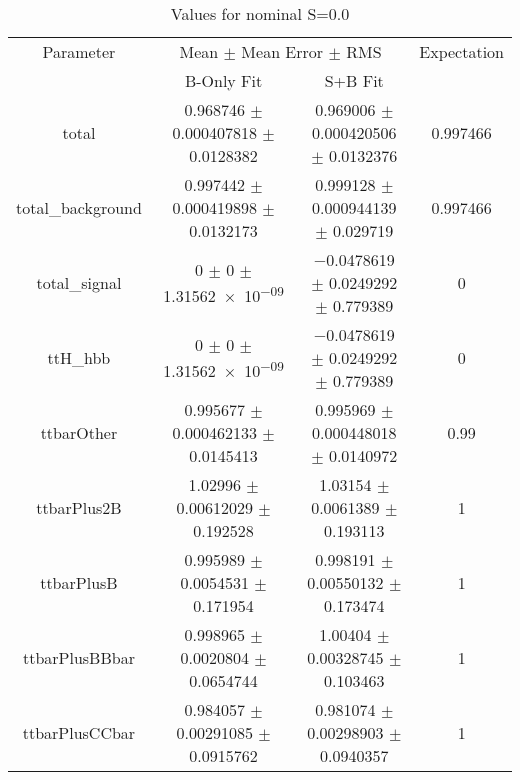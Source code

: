 \begin{table}
\centering
\caption{Values for nominal S=0.0}
\begin{tabular}{cccc}
\toprule
Parameter & \multicolumn{2}{c}{Mean $\pm$ Mean Error $\pm$ RMS} & Expectation\\
 & B-Only Fit & S+B Fit & \\
\midrule
total & \num{0.968746} $\pm$ \num{0.000407818} $\pm$ \num{0.0128382} & \num{0.969006} $\pm$ \num{0.000420506} $\pm$ \num{0.0132376} & \num{0.997466}\\
total\_background & \num{0.997442} $\pm$ \num{0.000419898} $\pm$ \num{0.0132173} & \num{0.999128} $\pm$ \num{0.000944139} $\pm$ \num{0.029719} & \num{0.997466}\\
total\_signal & \num{0} $\pm$ \num{0} $\pm$ \num{1.31562e-09} & \num{-0.0478619} $\pm$ \num{0.0249292} $\pm$ \num{0.779389} & \num{0}\\
ttH\_hbb & \num{0} $\pm$ \num{0} $\pm$ \num{1.31562e-09} & \num{-0.0478619} $\pm$ \num{0.0249292} $\pm$ \num{0.779389} & \num{0}\\
ttbarOther & \num{0.995677} $\pm$ \num{0.000462133} $\pm$ \num{0.0145413} & \num{0.995969} $\pm$ \num{0.000448018} $\pm$ \num{0.0140972} & \num{0.99}\\
ttbarPlus2B & \num{1.02996} $\pm$ \num{0.00612029} $\pm$ \num{0.192528} & \num{1.03154} $\pm$ \num{0.0061389} $\pm$ \num{0.193113} & \num{1}\\
ttbarPlusB & \num{0.995989} $\pm$ \num{0.0054531} $\pm$ \num{0.171954} & \num{0.998191} $\pm$ \num{0.00550132} $\pm$ \num{0.173474} & \num{1}\\
ttbarPlusBBbar & \num{0.998965} $\pm$ \num{0.0020804} $\pm$ \num{0.0654744} & \num{1.00404} $\pm$ \num{0.00328745} $\pm$ \num{0.103463} & \num{1}\\
ttbarPlusCCbar & \num{0.984057} $\pm$ \num{0.00291085} $\pm$ \num{0.0915762} & \num{0.981074} $\pm$ \num{0.00298903} $\pm$ \num{0.0940357} & \num{1}\\
\bottomrule
\end{tabular}
\end{table}